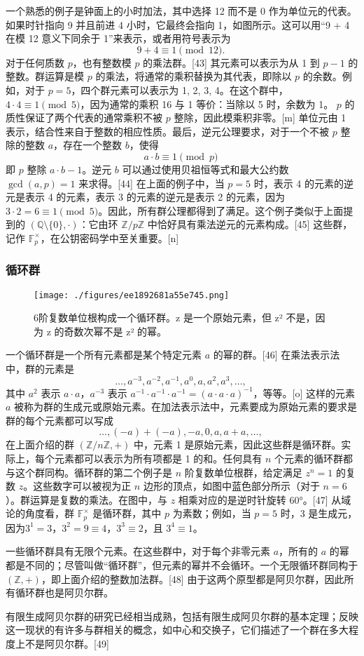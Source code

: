 一个熟悉的例子是钟面上的小时加法，其中选择 12 而不是 0 作为单位元的代表。如果时针指向 9 并且前进 4 小时，它最终会指向 1，如图所示。这可以用“9 + 4 在模 12 意义下同余于 1”来表示，或者用符号表示为  
\[
9 + 4 \equiv 1 \pmod{12}.~
\]
对于任何质数 \( p \)，也有整数模 \( p \) 的乘法群。[43] 其元素可以表示为从 1 到 \( p - 1 \) 的整数。群运算是模 \( p \) 的乘法，将通常的乘积替换为其代表，即除以 \( p \) 的余数。例如，对于 \( p = 5 \)，四个群元素可以表示为 1, 2, 3, 4。在这个群中，\( 4 \cdot 4 \equiv 1 \pmod{5} \)，因为通常的乘积 16 与 1 等价：当除以 5 时，余数为 1。 \( p \) 的质性保证了两个代表的通常乘积不被 \( p \) 整除，因此模乘积非零。[m] 单位元由 1 表示，结合性来自于整数的相应性质。最后，逆元公理要求，对于一个不被 \( p \) 整除的整数 \( a \)，存在一个整数 \( b \)，使得  
\[
a \cdot b \equiv 1 \pmod{p}~
\]
即 \( p \) 整除 \( a \cdot b - 1 \)。逆元 \( b \) 可以通过使用贝祖恒等式和最大公约数 \( \gcd(a, p) = 1 \) 来求得。[44] 在上面的例子中，当 \( p = 5 \) 时，表示 4 的元素的逆元是表示 4 的元素，表示 3 的元素的逆元是表示 2 的元素，因为 \( 3 \cdot 2 = 6 \equiv 1 \pmod{5} \)。因此，所有群公理都得到了满足。这个例子类似于上面提到的 \( (\mathbb{Q} \setminus \{0\}, \cdot) \)：它由环 \( \mathbb{Z}/p\mathbb{Z} \) 中恰好具有乘法逆元的元素构成。[45] 这些群，记作 \( \mathbb{F}_p^\times \)，在公钥密码学中至关重要。[n]
\subsubsection{循环群}
\begin{figure}[ht]
\centering
\texttt{[image: ./figures/ee1892681a55e745.png]}
\caption{6阶复数单位根构成一个循环群。z 是一个原始元素，但 z² 不是，因为 z 的奇数次幂不是 z² 的幂。} \label{fig_GroupM_6}
\end{figure}
一个循环群是一个所有元素都是某个特定元素 \(a\) 的幂的群。[46] 在乘法表示法中，群的元素是  
\[\dots, a^{-3}, a^{-2}, a^{-1}, a^{0}, a, a^2, a^3, \dots,~\]
其中 \(a^2\) 表示 \(a \cdot a\)，\(a^{-3}\) 表示 \(a^{-1} \cdot a^{-1} \cdot a^{-1} = (a \cdot a \cdot a)^{-1}\)，等等。[o] 这样的元素 \(a\) 被称为群的生成元或原始元素。在加法表示法中，元素要成为原始元素的要求是群的每个元素都可以写成  
\[\dots, (-a) + (-a), -a, 0, a, a + a, \dots,~\]
在上面介绍的群 \((\mathbb{Z}/n\mathbb{Z}, +)\) 中，元素 1 是原始元素，因此这些群是循环群。实际上，每个元素都可以表示为所有项都是 1 的和。任何具有 \(n\) 个元素的循环群都与这个群同构。循环群的第二个例子是 \(n\) 阶复数单位根群，给定满足 \(z^n = 1\) 的复数 \(z\)。这些数字可以被视为正 \(n\) 边形的顶点，如图中蓝色部分所示（对于 \(n = 6\)）。群运算是复数的乘法。在图中，与 \(z\) 相乘对应的是逆时针旋转 60°。[47] 从域论的角度看，群 \(\mathbb{F}_p^\times\) 是循环群，其中 \(p\) 为素数；例如，当 \(p = 5\) 时，3 是生成元，因为\(3^1 = 3\)，\(3^2 = 9 \equiv 4\)，\(3^3 \equiv 2\)，且 \(3^4 \equiv 1\)。

一些循环群具有无限个元素。在这些群中，对于每个非零元素 \(a\)，所有的 \(a\) 的幂都是不同的；尽管叫做“循环群”，但元素的幂并不会循环。一个无限循环群同构于 \((\mathbb{Z}, +)\)，即上面介绍的整数加法群。[48] 由于这两个原型都是阿贝尔群，因此所有循环群也是阿贝尔群。

有限生成阿贝尔群的研究已经相当成熟，包括有限生成阿贝尔群的基本定理；反映这一现状的有许多与群相关的概念，如中心和交换子，它们描述了一个群在多大程度上不是阿贝尔群。[49]